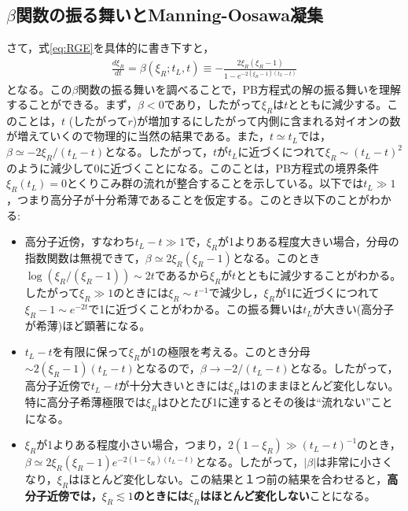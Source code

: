 \documentclass[11pt,a4paper]{ltjsarticle}
\theoremstyle{definition}
\theoremstyle{remark}
\begin{document}
\subsection{$\beta$関数の振る舞いとManning-Oosawa凝集}
さて，式\eqref{eq:RGE}を具体的に書き下すと，
\begin{align}
  \frac{d\xi_R}{dt} = \beta(\xi_R;t_L,t) \equiv -\frac{2\xi_R(\xi_R-1)}{1-e^{-2(\xi_R-1)(t_L-t)}} \label{eq:beta_function}
\end{align}
となる。この$\beta$関数の振る舞いを調べることで，PB方程式の解の振る舞いを理解することができる。まず，$\beta <0$であり，したがって$\xi_R$は$t$とともに減少する。このことは，$t$ (したがって$r$)が増加するにしたがって内側に含まれる対イオンの数が増えていくので物理的に当然の結果である。また，$t\simeq t_L$では，$\beta \simeq -2\xi_R/(t_L-t)$となる。したがって，$t$が$t_L$に近づくにつれて$\xi_R\sim (t_L-t)^2$のように減少して0に近づくことになる。このことは，PB方程式の境界条件$\xi_R(t_L)=0$とくりこみ群の流れが整合することを示している。以下では$t_L\gg 1$，つまり高分子が十分希薄であることを仮定する。このとき以下のことがわかる:
\begin{itemize}
  \item 高分子近傍，すなわち$t_L - t\gg1$で，$\xi_R$が1よりある程度大きい場合，分母の指数関数は無視できて，$\beta \simeq 2\xi_R(\xi_R-1)$となる。このとき$\log(\xi_R/(\xi_R-1))\sim 2t$であるから$\xi_R$が$t$とともに減少することがわかる。したがって$\xi_R\gg 1$のときには$\xi_R\sim t^{-1}$で減少し，$\xi_R$が1に近づくにつれて$\xi_R-1\sim e^{-2t}$で1に近づくことがわかる。この振る舞いは$t_L$が大きい(高分子が希薄)ほど顕著になる。
  \item $t_L-t$を有限に保って$\xi_R$が1の極限を考える。このとき分母$\sim 2(\xi_R-1)(t_L-t)$となるので，$\beta \to -2/(t_L-t)$となる。したがって，高分子近傍で$t_L-t$が十分大きいときには$\xi_R$は1のままほとんど変化しない。特に高分子希薄極限では$\xi_R$はひとたび1に達するとその後は``流れない''ことになる。
  \item $\xi_R$が1よりある程度小さい場合，つまり，$2(1-\xi_R) \gg (t_L-t)^{-1}$のとき，$\beta \simeq 2\xi_R(\xi_R-1)e^{-2(1-\xi_R)(t_L-t)}$となる。したがって，$|\beta|$は非常に小さくなり，$\xi_R$はほとんど変化しない。この結果と１つ前の結果を合わせると，\textbf{高分子近傍では，$\xi_R\lesssim 1$のときには$\xi_R$はほとんど変化しない}ことになる。
\end{itemize}
\end{document}
